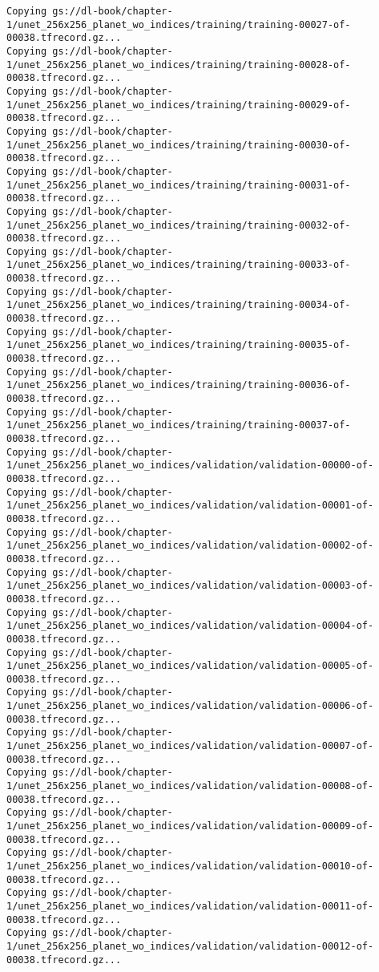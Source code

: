 \documentclass[
  letterpaper,
  DIV=11,
  numbers=noendperiod]{scrreprt}
\begin{document}
\begin{verbatim}
Copying gs://dl-book/chapter-1/unet_256x256_planet_wo_indices/training/training-00027-of-00038.tfrecord.gz...
Copying gs://dl-book/chapter-1/unet_256x256_planet_wo_indices/training/training-00028-of-00038.tfrecord.gz...
Copying gs://dl-book/chapter-1/unet_256x256_planet_wo_indices/training/training-00029-of-00038.tfrecord.gz...
Copying gs://dl-book/chapter-1/unet_256x256_planet_wo_indices/training/training-00030-of-00038.tfrecord.gz...
Copying gs://dl-book/chapter-1/unet_256x256_planet_wo_indices/training/training-00031-of-00038.tfrecord.gz...
Copying gs://dl-book/chapter-1/unet_256x256_planet_wo_indices/training/training-00032-of-00038.tfrecord.gz...
Copying gs://dl-book/chapter-1/unet_256x256_planet_wo_indices/training/training-00033-of-00038.tfrecord.gz...
Copying gs://dl-book/chapter-1/unet_256x256_planet_wo_indices/training/training-00034-of-00038.tfrecord.gz...
Copying gs://dl-book/chapter-1/unet_256x256_planet_wo_indices/training/training-00035-of-00038.tfrecord.gz...
Copying gs://dl-book/chapter-1/unet_256x256_planet_wo_indices/training/training-00036-of-00038.tfrecord.gz...
Copying gs://dl-book/chapter-1/unet_256x256_planet_wo_indices/training/training-00037-of-00038.tfrecord.gz...
Copying gs://dl-book/chapter-1/unet_256x256_planet_wo_indices/validation/validation-00000-of-00038.tfrecord.gz...
Copying gs://dl-book/chapter-1/unet_256x256_planet_wo_indices/validation/validation-00001-of-00038.tfrecord.gz...
Copying gs://dl-book/chapter-1/unet_256x256_planet_wo_indices/validation/validation-00002-of-00038.tfrecord.gz...
Copying gs://dl-book/chapter-1/unet_256x256_planet_wo_indices/validation/validation-00003-of-00038.tfrecord.gz...
Copying gs://dl-book/chapter-1/unet_256x256_planet_wo_indices/validation/validation-00004-of-00038.tfrecord.gz...
Copying gs://dl-book/chapter-1/unet_256x256_planet_wo_indices/validation/validation-00005-of-00038.tfrecord.gz...
Copying gs://dl-book/chapter-1/unet_256x256_planet_wo_indices/validation/validation-00006-of-00038.tfrecord.gz...
Copying gs://dl-book/chapter-1/unet_256x256_planet_wo_indices/validation/validation-00007-of-00038.tfrecord.gz...
Copying gs://dl-book/chapter-1/unet_256x256_planet_wo_indices/validation/validation-00008-of-00038.tfrecord.gz...
Copying gs://dl-book/chapter-1/unet_256x256_planet_wo_indices/validation/validation-00009-of-00038.tfrecord.gz...
Copying gs://dl-book/chapter-1/unet_256x256_planet_wo_indices/validation/validation-00010-of-00038.tfrecord.gz...
Copying gs://dl-book/chapter-1/unet_256x256_planet_wo_indices/validation/validation-00011-of-00038.tfrecord.gz...
Copying gs://dl-book/chapter-1/unet_256x256_planet_wo_indices/validation/validation-00012-of-00038.tfrecord.gz...

\end{verbatim}
\end{document}
